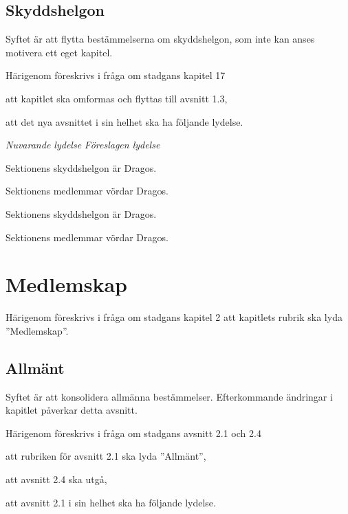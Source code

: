 \documentclass{article}
\newenvironment{lydelse}
    {\begin{paracol}{2}%
        \emph{Nuvarande lydelse}%
        \switchcolumn%
        \emph{Föreslagen lydelse}%
    \end{paracol}%
    \begin{enumerate}[label=\thesubsection.\arabic*]%
    \begin{paracol}{2}%
    }{\end{paracol}\end{enumerate}}
\begin{document}
\subsection{Skyddshelgon}
Syftet är att flytta bestämmelserna om skyddshelgon, som inte kan anses motivera ett eget kapitel.

Härigenom föreskrivs i fråga om stadgans kapitel 17
\begin{dels}
    \item att kapitlet ska omformas och flyttas till avsnitt 1.3,
    \item att det nya avsnittet i sin helhet ska ha följande lydelse.
\end{dels}

\begin{lydelse}
    \setcounter{section}{17}
    \setcounter{subsection}{1}
    \item Sektionens skyddshelgon är Dragos.
    
    \item Sektionens medlemmar vördar Dragos.
    
    \setcounter{section}{1}
    \setcounter{subsection}{3}
    \switchcolumn
    
    \item Sektionens skyddshelgon är Dragos.
    \item Sektionens medlemmar vördar Dragos.
\end{lydelse}

\section{Medlemskap}
Härigenom föreskrivs i fråga om stadgans kapitel 2 att kapitlets rubrik ska lyda ''Medlemskap''.

\subsection{Allmänt}
Syftet är att konsolidera allmänna bestämmelser.
Efterkommande ändringar i kapitlet påverkar detta avsnitt.

Härigenom föreskrivs i fråga om stadgans avsnitt 2.1 och 2.4
\begin{dels}
    \item att rubriken för avsnitt 2.1 ska lyda ''Allmänt'',
    \item att avsnitt 2.4 ska utgå,
    \item att avsnitt 2.1 i sin helhet ska ha följande lydelse.
\end{dels}
\end{document}
